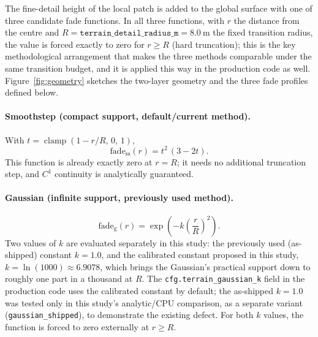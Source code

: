 The fine-detail height of the local patch is added to the global surface with
one of three candidate fade functions. In all three functions, with $r$ the
distance from the centre and $R = \texttt{terrain\_detail\_radius\_m} =
\SI{8.0}{\metre}$ the fixed transition radius, the value is forced exactly to
zero for $r \ge R$ (hard truncation); this is the key methodological
arrangement that makes the three methods comparable under the same transition
budget, and it is applied this way in the production code as well.
Figure~\ref{fig:geometry} sketches the two-layer geometry and the three fade
profiles defined below.

\paragraph{Smoothstep (compact support, default/current method).}
With $t = \operatorname{clamp}(1 - r/R,\, 0,\, 1)$,
\begin{equation}
  \mathrm{fade}_{\mathrm{ss}}(r) = t^{2}\,(3 - 2t).
  \label{eq:smoothstep}
\end{equation}
This function is already exactly zero at $r = R$; it needs no additional
truncation step, and $C^{1}$ continuity is analytically guaranteed.

\paragraph{Gaussian (infinite support, previously used method).}
\begin{equation}
  \mathrm{fade}_{\mathrm{g}}(r) = \exp\!\left(-k \left(\frac{r}{R}\right)^{2}\right).
  \label{eq:gaussian}
\end{equation}
Two values of $k$ are evaluated separately in this study: the previously used
(as-shipped) constant $k = 1.0$, and the calibrated constant proposed in this
study, $k = \ln(1000) \approx 6.9078$, which brings the Gaussian's practical
support down to roughly one part in a thousand at $R$. The
\texttt{cfg.terrain\_gaussian\_k} field in the production code uses the
calibrated constant by default; the as-shipped $k = 1.0$ was tested only in
this study's analytic/CPU comparison, as a separate variant
(\texttt{gaussian\_shipped}), to demonstrate the existing defect. For both $k$
values, the function is forced to zero externally at $r \ge R$.

